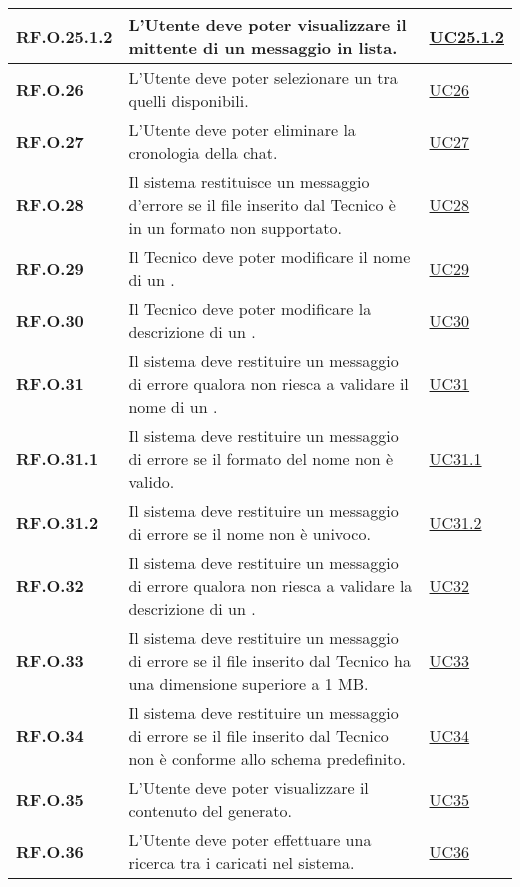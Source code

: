 \begin{adjustwidth}{-0.5cm}{-0.5cm}
\begin{longtable}{|P{3cm}|P{6,5cm}|>{\arraybackslash}P{4cm}|}
    \hline
    \textbf{RF.O.25.1.2} & L'Utente deve poter visualizzare il mittente di un messaggio in lista. &  \hyperref[UC25poin1point2]{UC25.1.2}\\
    \hline
    \textbf{RF.O.26} & L'Utente deve poter selezionare un  tra quelli disponibili. & \hyperref[UC26]{UC26} \\
    \hline
    \textbf{RF.O.27} & L'Utente deve poter eliminare la cronologia della chat. & \hyperref[UC27]{UC27} \\
    \hline
    \textbf{RF.O.28} & Il sistema restituisce un messaggio d'errore se il file inserito dal Tecnico è in un formato non supportato. & \hyperref[UC28]{UC28} \\
    \hline
    \textbf{RF.O.29} & Il Tecnico deve poter modificare il nome di un . & \hyperref[UC29]{UC29} \\
    \hline
    \textbf{RF.O.30} & Il Tecnico deve poter modificare la descrizione di un . & \hyperref[UC30]{UC30} \\
    \hline
    \textbf{RF.O.31} & Il sistema deve restituire un messaggio di errore qualora non riesca a validare il nome di un . & \hyperref[UC31]{UC31} \\
    \hline
    \textbf{RF.O.31.1} & Il sistema deve restituire un messaggio di errore se il formato del nome non è valido. & \hyperref[UC31point1]{UC31.1} \\
    \hline
    \textbf{RF.O.31.2} & Il sistema deve restituire un messaggio di errore se il nome non è univoco. & \hyperref[UC31point2]{UC31.2} \\
    \hline
    \textbf{RF.O.32} & Il sistema deve restituire un messaggio di errore qualora non riesca a validare la descrizione di un . & \hyperref[UC32]{UC32} \\
    \hline
    \textbf{RF.O.33} & Il sistema deve restituire un messaggio di errore se il file inserito dal Tecnico ha una dimensione superiore a 1 MB. & \hyperref[UC33]{UC33} \\
    \hline
    \textbf{RF.O.34} & Il sistema deve restituire un messaggio di errore se il file inserito dal Tecnico non è conforme allo schema predefinito. & \hyperref[UC34]{UC34} \\
    \hline
    \textbf{RF.O.35} & L'Utente deve poter visualizzare il contenuto del  generato. & \hyperref[UC35]{UC35} \\
    \hline
    \textbf{RF.O.36} & L'Utente deve poter effettuare una ricerca tra i  caricati nel sistema. & \hyperref[UC36]{UC36} \\

\end{longtable}
\end{adjustwidth}
